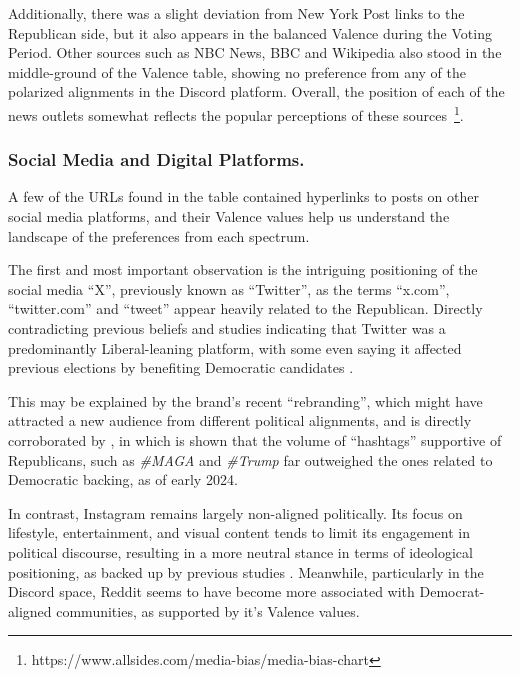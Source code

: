 Additionally, there was a slight deviation from New York Post links to the Republican side, but it also appears in the balanced Valence during the Voting Period. Other sources such as NBC News, BBC and Wikipedia also stood in the middle-ground of the Valence table, showing no preference from any of the polarized alignments in the Discord platform. Overall, the position of each of the news outlets somewhat reflects the popular perceptions of these sources~\footnote{https://www.allsides.com/media-bias/media-bias-chart}.

\subsubsection{Social Media and Digital Platforms.\\}
\label{sec:social_media}

A few of the URLs found in the table contained hyperlinks to posts on other social media platforms, and their Valence values help us understand the landscape of the preferences from each spectrum.

The first and most important observation is the intriguing positioning of the social media ``X'', previously known as ``Twitter'', as the terms ``x.com'', ``twitter.com'' and ``tweet'' appear heavily related to the Republican. Directly contradicting previous beliefs and studies indicating that Twitter was a predominantly Liberal-leaning platform, with some even saying it affected previous elections by benefiting Democratic candidates \cite{fujiwara2024effect}.

This may be explained by the brand's recent ``rebranding'', which might have attracted a new audience from different political alignments, and is directly corroborated by \cite{balasubramanian2024publicdatasettrackingsocial}, in which is shown that the volume of ``hashtags'' supportive of Republicans, such as \textit{\#MAGA} and \textit{\#Trump} far outweighed the ones related to Democratic backing, as of early 2024.

In contrast, Instagram remains largely non-aligned politically. Its focus on lifestyle, entertainment, and visual content tends to limit its engagement in political discourse, resulting in a more neutral stance in terms of ideological positioning, as backed up by previous studies \cite{allcott24theeffects}. Meanwhile, particularly in the Discord space, Reddit seems to have become more associated with Democrat-aligned communities, as supported by it's Valence values.


